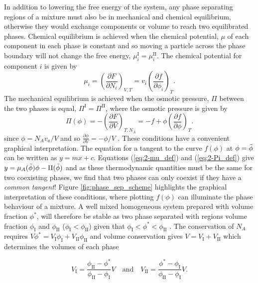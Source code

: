 In addition to lowering the free energy of the system, any phase separating regions of a mixture must also be in mechanical and chemical equilibrium, otherwise they would exchange components or volume to reach two equilibrated phases. Chemical equilibrium is achieved when the chemical potential, $\mu$ of each component in each phase is constant and so moving a particle across the phase boundary will not change the free energy, $\mu_i^{\mathrm{I}}=\mu_i^{\mathrm{II}}$. The chemical potential for component $i$ is given by
\begin{equation}
    \mu_i = \left(\frac{\partial F}{\partial N_i}\right)_{V, T} = v_i \left(\frac{\partial f}{\partial \phi_i}\right)_{T}.
    \label{eq:2-mu_def}
\end{equation}
The mechanical equilibrium is achieved when the osmotic pressure, $\Pi$ between the two phases is equal, $\Pi^{\mathrm{I}}=\Pi^{\mathrm{II}}$, where the osmotic pressure is given by
\begin{equation}
    \Pi(\phi) = -\left(\frac{\partial F}{\partial V}\right)_{T, N_A} = -f + \phi \left(\frac{\partial f}{\partial \phi}\right)_{T}.
    \label{eq:2-Pi_def}
\end{equation}
since $\phi = N_A v_a/V$ and so $\frac{\partial \phi}{\partial V} = -\phi/V$ \cite{doi_soft_2013}. These conditions have a convenient graphical interpretation. The equation for a tangent to the curve $f(\phi)$ at $\phi=\Tilde{\phi}$ can be written as $y=mx+c$. Equations (\ref{eq:2-mu_def}) and (\ref{eq:2-Pi_def}) give $y=\mu_A(\Tilde{\phi})\phi - \Pi(\Tilde{\phi})$ and as these thermodynamic quantities must be the same for two coexisting phases, we find that two phases can only coexist if they have a \textit{common tangent}! Figure \ref{fig:phase_sep_scheme} highlights the graphical interpretation of these conditions, where plotting $f(\phi)$ can illuminate the phase behaviour of a mixture. A well mixed homogeneous system prepared with volume fraction $\phi^*$, will therefore be stable as two phase separated with regions volume fraction $\phi_{\mathrm{I}}$ and $\phi_{\mathrm{II}}$ ($\phi_{\mathrm{I}} < \phi_{\mathrm{II}}$) given that $\phi_{\mathrm{I}} < \phi^* < \phi_{\mathrm{II}}$ \cite{weber2019physics}. The conservation of $N_A$ requires $V\phi^* = V_{\mathrm{I}}\phi_{\mathrm{I}} +V_{\mathrm{II}}\phi_{\mathrm{II}}$ and volume conservation gives $V = V_{\mathrm{I}}+V_{\mathrm{II}}$ which determines the volumes of each phase

\begin{equation}
    V_{\mathrm{I}} = \frac{\phi_{\mathrm{II}}-\phi^*}{\phi_{\mathrm{II}}-\phi_{\mathrm{I}}}V
    \quad
    \textrm{and}
    \quad
    V_{\mathrm{II}} = \frac{\phi^*-\phi_{\mathrm{I}}}{\phi_{\mathrm{II}}-\phi_{\mathrm{I}}}V.
\end{equation}

